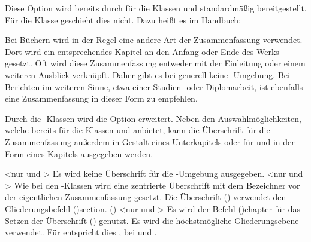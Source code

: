 \begin{DeclareEntity*}{}
\begin{DeclareEntity*}{}
\begin{DeclareEntity*}{}
\begin{Declaration}
Diese Option wird bereits durch \KOMAScript für die Klassen  
und  standardmäßig bereitgestellt. Für die Klasse 
 geschieht dies nicht. Dazu heißt es im Handbuch:
%
\begin{quoting}
Bei Büchern wird in der Regel eine andere Art der Zusammenfassung verwendet. 
Dort wird ein entsprechendes Kapitel an den Anfang oder Ende des Werks gesetzt. 
Oft wird diese Zusammenfassung entweder mit der Einleitung oder einem weiteren 
Ausblick verknüpft. Daher gibt es bei  generell keine 
-Umgebung. Bei Berichten im weiteren Sinne, etwa einer 
Studien- oder Diplomarbeit, ist ebenfalls eine Zusammenfassung in dieser Form 
zu empfehlen.
\end{quoting}
%
Durch die \TUDScript-Klassen wird die Option  erweitert. 
Neben den Auswahlmöglichkeiten, welche \KOMAScript bereits für die Klassen 
 und  anbietet, kann die Überschrift für 
die Zusammenfassung außerdem in Gestalt eines Unterkapitels oder für 
 und  in der Form eines Kapitels
ausgegeben werden.
%
\begin{DeclareValues}{}
<nur  und >
  Es wird keine Überschrift für die -Umgebung ausgegeben.
<nur  und >
  Wie bei den \KOMAScript-Klassen wird eine zentrierte Überschrift mit dem 
  Bezeichner  vor der eigentlichen Zusammenfassung gesetzt.
  Die Überschrift () verwendet den Gliederungsbefehl 
  \Macro(){section}.
()
    <nur  und >
  Es wird der Befehl \Macro(){chapter} für das 
  Setzen der Überschrift () genutzt. 
  Es wird die höchstmögliche Gliederungsebene verwendet. Für 
   entspricht dies , bei 
   und  .
\end{DeclareValues}


\end{Declaration}
\end{DeclareEntity*}
\end{DeclareEntity*}
\end{DeclareEntity*}
